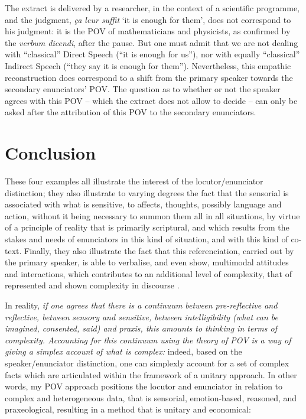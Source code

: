 \documentclass[output=paper]{langscibook}
\begin{document}
The extract is delivered by a researcher, in the context of a scientific programme, and the judgment, \textit{ça leur suffit} ‘it is enough for them’, does not correspond to his judgment: it is the POV of mathematicians and physicists, as confirmed by the \textit{verbum dicendi}, after the pause. But one must admit that we are not dealing with  “classical” Direct Speech (“it is enough for us”), nor with equally “classical” Indirect Speech (“they say it is enough for them”). Nevertheless, this empathic reconstruction does correspond to a shift from the primary speaker towards the secondary enunciators’ POV. The question as to whether or not the speaker agrees with this POV – which the extract does not allow to decide – can only be asked after the attribution of this POV to the secondary enunciators. 

\section{Conclusion}

These four examples all illustrate the interest of the locutor/enunciator distinction; they also illustrate to varying degrees the fact that the sensorial is associated with what is sensitive, to affects, thoughts, possibly language and action, without it being necessary to summon them all in all situations, by virtue of a principle of reality that is primarily scriptural, and which results from the stakes and needs of enunciators in this kind of situation, and with this kind of co-text. Finally, they also illustrate the fact that this referenciation, carried out by the primary speaker, is able to verbalise, and even show, multimodal attitudes and interactions, which contributes to an additional level of complexity, that of represented and shown complexity in discourse \citep{Rabatel2013}. 

In reality, \textit{if one agrees that there is a continuum between pre-reflective and reflective, between sensory and sensitive, between intelligibility (what can be imagined, consented, said) and praxis, this amounts to thinking in terms of complexity. Accounting for this continuum using the theory of POV is a way of giving a simplex account of what is complex:} indeed, based on the speaker/enunciator distinction, one can simplexly account for a set of complex facts which are articulated within the framework of a unitary approach. In other words, my POV approach positions the locutor and enunciator in relation to complex and heterogeneous data, that is sensorial, emotion-based, reasoned, and praxeological, resulting in a method that is unitary and economical:
\end{document}
